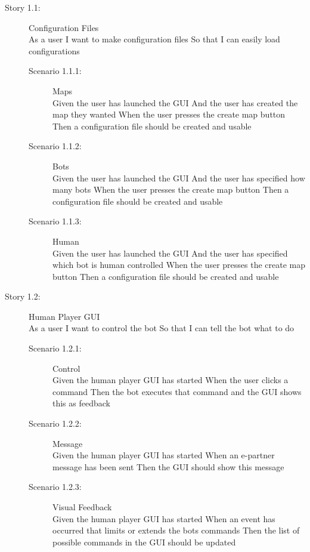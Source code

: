 \begin{description}
	\item[Story 1.1:] Configuration Files\\
	As a user
	I want to make configuration files
	So that I can easily load configurations

	\begin{description}
		\item[Scenario 1.1.1:] Maps\\
		Given the user has launched the GUI
		And the user has created the map they wanted
		When the user presses the create map button
		Then a configuration file should be created and usable
		
		\item[Scenario 1.1.2:] Bots\\
		Given the user has launched the GUI
		And the user has specified how many bots
		When the user presses the create map button
		Then a configuration file should be created and usable

		\item[Scenario 1.1.3:] Human\\
		Given the user has launched the GUI
		And the user has specified which bot is human controlled
		When the user presses the create map button
		Then a configuration file should be created and usable
	\end{description}
\end{description}

\begin{description}
	\item[Story 1.2:] Human Player GUI\\
	As a user 
	I want to control the bot
	So that I can tell the bot what to do

	\begin{description}
		\item[Scenario 1.2.1:] Control\\
		Given the human player GUI has started
		When the user clicks a command
		Then the bot executes that command and the GUI shows this as feedback

		\item[Scenario 1.2.2:] Message\\
		Given the human player GUI has started
		When an e-partner message has been sent
		Then the GUI should show this message

		\item[Scenario 1.2.3:] Visual Feedback\\
		Given the human player GUI has started
		When an event has occurred that limits or extends the bots commands
		Then the list of possible commands in the GUI should be updated
		\end{description}
	\end{description}


